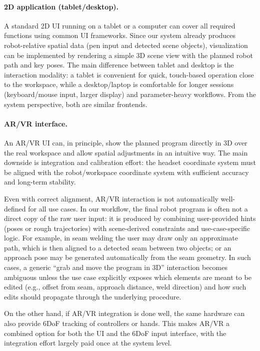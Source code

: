 \paragraph{2D application (tablet/desktop).}
A standard 2D UI running on a tablet or a computer can cover all required functions using common UI frameworks. Since our system already produces robot-relative spatial data (pen input and detected scene objects), visualization can be implemented by rendering a simple 3D scene view with the planned robot path and key poses. The main difference between tablet and desktop is the interaction modality: a tablet is convenient for quick, touch-based operation close to the workspace, while a desktop/laptop is comfortable for longer sessions (keyboard/mouse input, larger display) and parameter-heavy workflows. From the system perspective, both are similar frontends.

\paragraph{AR/VR interface.}
An AR/VR UI can, in principle, show the planned program directly in 3D over the real workspace and allow spatial adjustments in an intuitive way. The main downside is integration and calibration effort: the headset coordinate system must be aligned with the robot/workspace coordinate system with sufficient accuracy and long-term stability.

Even with correct alignment, AR/VR interaction is not automatically well-defined for all use cases. In our workflow, the final robot program is often not a direct copy of the raw user input: it is produced by combining user-provided hints (poses or rough trajectories) with scene-derived constraints and use-case-specific logic. For example, in seam welding the user may draw only an approximate path, which is then aligned to a detected seam between two objects; or an approach pose may be generated automatically from the seam geometry. In such cases, a generic ``grab and move the program in 3D'' interaction becomes ambiguous unless the use case explicitly exposes which elements are meant to be edited (e.g., offset from seam, approach distance, weld direction) and how such edits should propagate through the underlying procedure.

On the other hand, if AR/VR integration is done well, the same hardware can also provide 6DoF tracking of controllers or hands. This makes AR/VR a combined option for both the UI and the 6DoF input interface, with the integration effort largely paid once at the system level.


